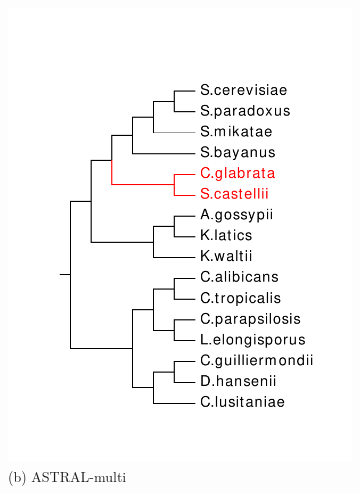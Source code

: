 \begin{figure}[!h]
\begin{subfigure}[t]{0.31\textwidth}
		\includegraphics[width=\textwidth]{figures/fastmulrfs-fig3b.pdf}
		\caption{(b) ASTRAL-multi} 
	\end{subfigure}
	~
	\begin{subfigure}[t]{0.31\textwidth}
	\centering

\end{subfigure}
\end{figure}
